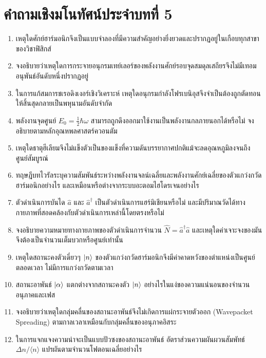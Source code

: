 \section{คำถามเชิงมโนทัศน์ประจำบทที่ 5}
\label{sec_conceptual_questions_ch05}

\begin{enumerate}
    \item เหตุใดศักย์ฮาร์มอนิกจึงเป็นแบบจำลองที่มีความสำคัญอย่างยิ่งยวดและปรากฏอยู่ในเกือบทุกสาขาของวิชาฟิสิกส์
    \item จงอธิบายว่าเหตุใดการกระจายอนุกรมเทย์เลอร์ของพลังงานศักย์รอบจุดสมดุลเสถียรจึงไม่มีเทอมอนุพันธ์อันดับหนึ่งปรากฏอยู่
    \item ในการแก้สมการชเรอดิงเงอร์เชิงวิเคราะห์ เหตุใดอนุกรมกำลังโฟรเบนิอุสจึงจำเป็นต้องถูกตัดทอนให้สิ้นสุดกลายเป็นพหุนามอันดับจำกัด
    \item พลังงานจุดศูนย์ $E_0 = \frac{1}{2}\hbar\omega$ สามารถถูกดึงออกมาใช้งานเป็นพลังงานกลภายนอกได้หรือไม่ จงอธิบายตามหลักอุณหพลศาสตร์ควอนตัม
    \item เหตุใดธาตุฮีเลียมจึงไม่แข็งตัวเป็นของแข็งที่ความดันบรรยากาศปกติแม้จะลดอุณหภูมิลงจนถึงศูนย์สัมบูรณ์
    \item ทฤษฎีบทไวรัลระบุความสัมพันธ์ระหว่างพลังงานจลน์เฉลี่ยและพลังงานศักย์เฉลี่ยของตัวแกว่งกวัดฮาร์มอนิกอย่างไร และเหมือนหรือต่างจากระบบอะตอมไฮโดรเจนอย่างไร
    \item ตัวดำเนินการบันได $\hat{a}$ และ $\hat{a}^\dagger$ เป็นตัวดำเนินการแฮร์มิเชียนหรือไม่ และมีปริมาณวัดได้ทางกายภาพที่สอดคล้องกับตัวดำเนินการเหล่านี้โดยตรงหรือไม่
    \item จงอธิบายความหมายทางกายภาพของตัวดำเนินการจำนวน $\hat{N} = \hat{a}^\dagger\hat{a}$ และเหตุใดค่าเจาะจงของมันจึงต้องเป็นจำนวนเต็มบวกหรือศูนย์เท่านั้น
    \item เหตุใดสถานะคงตัวเดี่ยวๆ $\ket{n}$ ของตัวแกว่งกวัดฮาร์มอนิกจึงมีค่าคาดหวังของตำแหน่งเป็นศูนย์ตลอดเวลา ไม่มีการแกว่งกวัดตามเวลา
    \item สถานะอาพันธ์ $\ket{\alpha}$ แตกต่างจากสถานะคงตัว $\ket{n}$ อย่างไรในแง่ของความแน่นอนของจำนวนอนุภาคและเฟส
    \item จงอธิบายว่าเหตุใดกลุ่มคลื่นของสถานะอาพันธ์จึงไม่เกิดการแผ่กระจายตัวออก (Wavepacket Spreading) ตามกาลเวลาเหมือนกับกลุ่มคลื่นของอนุภาคอิสระ
    \item ในการแจกแจงความน่าจะเป็นแบบปัวซงของสถานะอาพันธ์ อัตราส่วนความผันผวนสัมพัทธ์ $\Delta n/\langle n \rangle$ แปรผันตามจำนวนโฟตอนเฉลี่ยอย่างไร

\end{enumerate}
